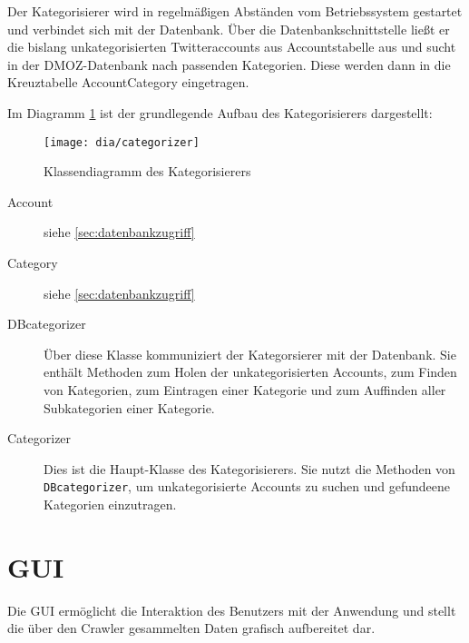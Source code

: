 Der Kategorisierer wird in regelmäßigen Abständen vom Betriebssystem gestartet und verbindet sich mit der Datenbank. Über die Datenbankschnittstelle ließt er die bislang unkategorisierten Twitteraccounts aus Accountstabelle aus und sucht in der DMOZ-Datenbank nach passenden Kategorien. Diese werden dann in die Kreuztabelle AccountCategory eingetragen.

Im Diagramm \ref{fig:categorizer} ist der grundlegende Aufbau des Kategorisierers dargestellt:
\begin{figure}[h]
	\texttt{[image: dia/categorizer]}
	\caption{Klassendiagramm des Kategorisierers}
	\label{fig:categorizer}
\end{figure}

\begin{description}
	\item[Account] siehe \cref{sec:datenbankzugriff}
	\item[Category] siehe \cref{sec:datenbankzugriff}
	\item[DBcategorizer] Über diese Klasse kommuniziert der Kategorsierer mit der Datenbank. Sie enthält Methoden zum Holen der unkategorisierten Accounts, zum Finden von Kategorien, zum Eintragen einer Kategorie und zum Auffinden aller Subkategorien einer Kategorie.
	\item[Categorizer] Dies ist die Haupt-Klasse des Kategorisierers. Sie nutzt die Methoden von \lstinline{DBcategorizer}, um unkategorisierte Accounts zu suchen und gefundeene Kategorien einzutragen.
\end{description}

\section{GUI}
Die GUI ermöglicht die Interaktion des Benutzers mit der Anwendung und stellt die über den Crawler gesammelten Daten grafisch aufbereitet dar. 


